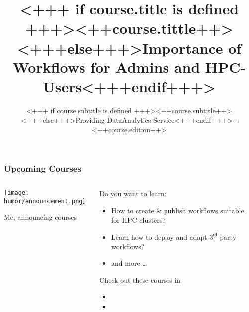 \documentclass[english,xcolor=pdftex,dvipsnames,aspectratio=<+++ if course.aspectratio is defined +++><++course.aspectratio++><+++else+++>43<+++endif+++>]{beamer}
\title[<++course.shorttitle++>]{<+++ if course.title is defined +++><++course.tittle++><+++else+++>Importance of \Snakemake Workflows for Admins and HPC-Users<+++endif+++>}
\subtitle{<+++ if course.subtitle is defined +++><++course.subtitle++><+++else+++>Providing DataAnalytics Service<+++endif+++> - <++course.edition++>}
\begin{document}

\sloppy

\begin{frame}[plain] %
  \titlepage
\end{frame}







%



\begin{frame}
	\frametitle{Upcoming Courses}
	\begin{columns}[T]
		\begin{column}{0.5\textwidth}
			\centering
			\texttt{[image: humor/announcement.png]}
			\caption{Me, announcing courses}
		\end{column}
	
	\begin{column}{0.5\textwidth}
		Do you want to learn:
		\begin{itemize}
			\item How to create \& publish \Snakemake workflows suitable for HPC clusters?
			\item Learn how to deploy and adapt $3^{\mathsf{rd}}$-party workflows?
			\item and more \ldots
		\end{itemize}
	    Check out these courses in
	    \begin{itemize}
	    	\item {}
	    	\item {}
	    \end{itemize}
	\end{column}
	
	\end{columns}
\end{frame}
      
\end{document}
